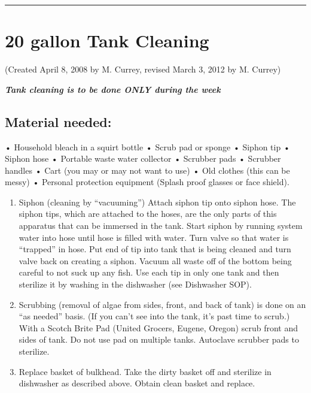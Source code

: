 \documentclass[
]{book}
\providecommand{\tightlist}{%
  \setlength{\itemsep}{0pt}\setlength{\parskip}{0pt}}
\begin{document}
\begin{center}\rule{0.5\linewidth}{0.5pt}\end{center}

\hypertarget{gallon-tank-cleaning}{%
\section{20 gallon Tank Cleaning}\label{gallon-tank-cleaning}}

(Created April 8, 2008 by M. Currey, revised March 3, 2012 by M. Currey)

\textbf{\emph{Tank cleaning is to be done ONLY during the week}}

\hypertarget{material-needed-1}{%
\subsection{Material needed:}\label{material-needed-1}}

• Household bleach in a squirt bottle
• Scrub pad or sponge
• Siphon tip
• Siphon hose
• Portable waste water collector
• Scrubber pads
• Scrubber handles
• Cart (you may or may not want to use)
• Old clothes (this can be messy)
• Personal protection equipment (Splash proof glasses or face shield).

\begin{enumerate}
\def\labelenumi{\arabic{enumi}.}
\tightlist
\item
  Siphon (cleaning by ``vacuuming'') Attach siphon tip onto siphon hose. The siphon tips, which are attached to the hoses, are the only parts of this apparatus that can be immersed in the tank. Start siphon by running system water into hose until hose is filled with water. Turn valve so that water is ``trapped'' in hose. Put end of tip into tank that is being cleaned and turn valve back on creating a siphon. Vacuum all waste off of the bottom being careful to not suck up any fish. Use each tip in only one tank and then sterilize it by washing in the dishwasher (see Dishwasher SOP).
\item
  Scrubbing (removal of algae from sides, front, and back of tank) is done on an ``as needed'' basis. (If you can't see into the tank, it's past time to scrub.) With a Scotch Brite Pad (United Grocers, Eugene, Oregon) scrub front and sides of tank. Do not use pad on multiple tanks. Autoclave scrubber pads to sterilize.
\item
  Replace basket of bulkhead. Take the dirty basket off and sterilize in dishwasher as described above. Obtain clean basket and replace.
\end{enumerate}
\end{document}

